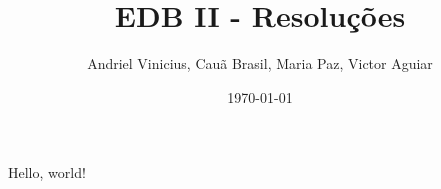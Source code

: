 \documentclass[12pt]{article}
\title{EDB II - Resoluções}
\author{Andriel Vinicius, Cauã Brasil, Maria Paz, Victor Aguiar}
\date{\today}
\begin{document}
\maketitle

Hello, world!


\end{document}
